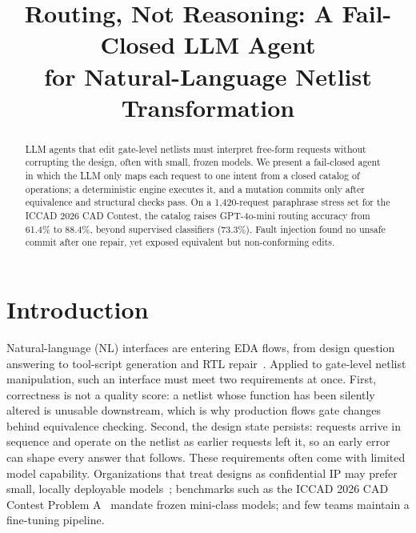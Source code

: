 \documentclass[conference,letterpaper]{IEEEtran}
\begin{document}
\title{Routing, Not Reasoning: A Fail-Closed LLM Agent\\for Natural-Language Netlist Transformation}

\author{
}

\maketitle

\begin{abstract}
LLM agents that edit gate-level netlists must interpret free-form requests
without corrupting the design, often with small, frozen models. We present a
fail-closed agent in which the LLM only maps each request to one intent from a
closed catalog of operations; a deterministic engine executes it, and a
mutation commits only after equivalence and structural checks pass. On a
1,420-request paraphrase stress set for the ICCAD 2026 CAD Contest, the catalog
raises GPT-4o-mini routing accuracy from 61.4\% to 88.4\%, beyond supervised
classifiers (73.3\%). Fault injection found no unsafe commit after one repair,
yet exposed equivalent but non-conforming edits.
\end{abstract}

\section{Introduction}
\label{sec:intro}

Natural-language (NL) interfaces are entering EDA flows, from design question
answering to tool-script generation and RTL repair~\cite{chateda,rtlfixer,verilogeval}.
Applied to gate-level netlist manipulation, such an interface must meet two
requirements at once. First, correctness is not a quality score: a netlist
whose function has been silently altered is unusable downstream, which is why
production flows gate changes behind equivalence checking. Second, the design
state persists: requests arrive in sequence and operate on the netlist as
earlier requests left it, so an early error can shape every answer that
follows. These requirements often come with limited model capability.
Organizations that treat designs as confidential IP may prefer small, locally
deployable models~\cite{chipnemo}; benchmarks such as the ICCAD 2026 CAD
Contest Problem A~\cite{problema} mandate frozen mini-class models; and few
teams maintain a fine-tuning pipeline.
\end{document}
